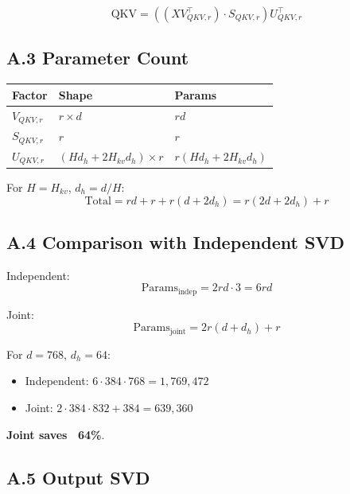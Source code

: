 \begin{equation}
\text{QKV} = \left((X V_{QKV, r}^\top) \cdot S_{QKV, r}\right) U_{QKV, r}^\top
\end{equation}

\subsection{A.3 Parameter Count}

\begin{table}[H]
\centering
\small
\begin{tabular}{lll}
\toprule
\textbf{Factor} & \textbf{Shape} & \textbf{Params} \\
\midrule
$V_{QKV, r}$ & $r \times d$ & $r d$ \\
$S_{QKV, r}$ & $r$ & $r$ \\
$U_{QKV, r}$ & $(H d_h + 2 H_{kv} d_h) \times r$ & $r (H d_h + 2 H_{kv} d_h)$ \\
\bottomrule
\end{tabular}
\end{table}

For $H = H_{kv}$, $d_h = d/H$:
\begin{equation}
\text{Total} = r d + r + r (d + 2 d_h) = r(2d + 2 d_h) + r
\end{equation}

\subsection{A.4 Comparison with Independent SVD}

Independent:
\begin{equation}
\text{Params}_\text{indep} = 2 r d \cdot 3 = 6 r d
\end{equation}

Joint:
\begin{equation}
\text{Params}_\text{joint} = 2 r (d + d_h) + r
\end{equation}

For $d = 768$, $d_h = 64$:
\begin{itemize}
\item Independent: $6 \cdot 384 \cdot 768 = 1,769,472$
\item Joint: $2 \cdot 384 \cdot 832 + 384 = 639,360$

\end{itemize}
\textbf{Joint saves ~64\%}.

\subsection{A.5 Output SVD}

